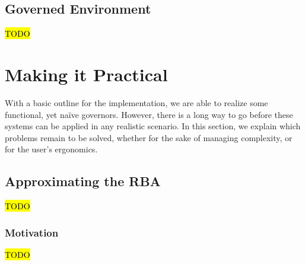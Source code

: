 \subsection{Governed Environment}
\hl{TODO}

\section{Making it Practical}
With a basic outline for the implementation, we are able to realize some functional, yet na\"ive governors. However, there is a long way to go before these systems can be applied in any realistic scenario. In this section, we explain which problems remain to be solved, whether for the sake of managing complexity, or for the user's ergonomics.

\subsection{Approximating the RBA}
\hl{TODO}
\subsubsection{Motivation}
\hl{TODO}

